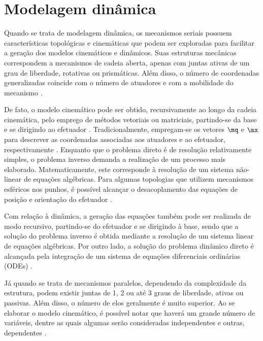 \documentclass[]{politex}
\begin{document}
\section{Modelagem dinâmica}

Quando se trata de modelagem dinâmica, os mecanismos seriais possuem características topológicas e cinemáticas que podem ser exploradas para facilitar a geração dos modelos cinemáticos e dinâmicos. Suas estruturas mecânicas correspondem a mecanismos de cadeia aberta, apenas com juntas ativas de um grau de liberdade, rotativas ou prismáticas. Além disso, o número de coordenadas generalizadas coincide com o número de atuadores e com a mobilidade do mecanismo \cite{Craig}. 

De fato, o modelo cinemático pode ser obtido, recursivamente ao longo da cadeia cinemática, pelo emprego de métodos vetoriais ou matriciais, partindo-se da base e se dirigindo ao efetuador \cite{Siciliano}. Tradicionalmente, empregam-se os vetores $\mq$ e $\mx$ para descrever as coordenadas associadas aos atuadores e ao efetuador, respectivamente \cite{Cabral, Carvalho}. Enquanto que o problema direto é de resolução relativamente simples, o problema inverso demanda a realização de um processo mais elaborado. Matematicamente, este corresponde à resolução de um sistema não-linear de equações algébricas. Para algumas topologias que utilizem mecanismos esféricos nos punhos, é possível alcançar o desacoplamento das equações de posição e orientação do efetuador \cite{Waldron}.

Com relação à dinâmica, a geração das equações também pode ser realizada de modo recursivo, partindo-se do efetuador e se dirigindo à base, sendo que a solução do problema inverso é obtida mediante a resolução de um sistema linear de equações algébricas. Por outro lado, a solução do problema dinâmico direto é alcançada pela integração de um sistema de equações diferenciais ordinárias (ODEs) \cite{Featherstone}.





Já quando se trata de mecanismos paralelos, dependendo da complexidade da estrutura, podem existir juntas de 1, 2 ou até 3 graus de liberdade, ativas ou passivas. Além disso, o número de elos geralmente é muito superior. Ao se elaborar o modelo cinemático, é possível notar que haverá um grande número de variáveis, dentre as quais algumas serão consideradas independentes e outras, dependentes \cite{Merlet}.
\end{document}
